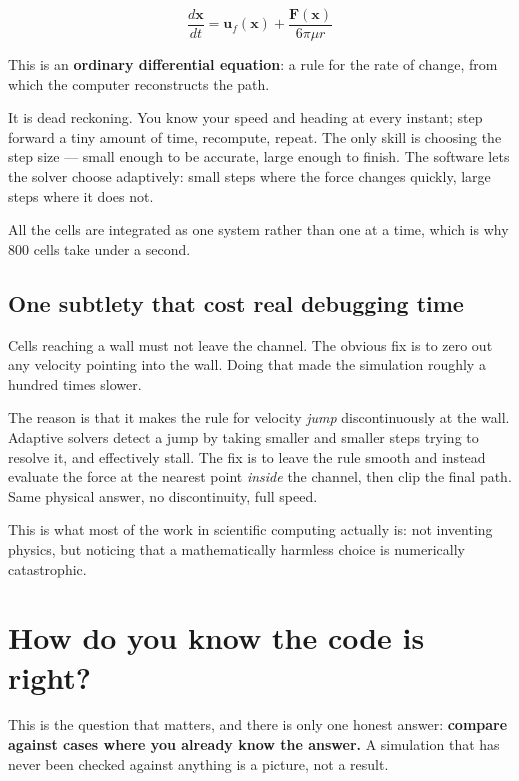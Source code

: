 \documentclass[11pt,a4paper]{article}
\begin{document}
\begin{equation}
\frac{d\symbf{x}}{dt}=\symbf{u}_f(\symbf{x})+\frac{\symbf{F}(\symbf{x})}{6\pi\mu r}
\end{equation}

This is an \textbf{ordinary differential equation}: a rule for the rate of
change, from which the computer reconstructs the path.

\begin{analogy}
It is dead reckoning. You know your speed and heading at every instant; step
forward a tiny amount of time, recompute, repeat. The only skill is choosing the
step size --- small enough to be accurate, large enough to finish. The software
lets the solver choose adaptively: small steps where the force changes quickly,
large steps where it does not.
\end{analogy}

All the cells are integrated as one system rather than one at a time, which is
why 800 cells take under a second.

\subsection*{One subtlety that cost real debugging time}

Cells reaching a wall must not leave the channel. The obvious fix is to zero out
any velocity pointing into the wall. Doing that made the simulation roughly a
hundred times slower.

The reason is that it makes the rule for velocity \emph{jump} discontinuously at
the wall. Adaptive solvers detect a jump by taking smaller and smaller steps
trying to resolve it, and effectively stall. The fix is to leave the rule smooth
and instead evaluate the force at the nearest point \emph{inside} the channel,
then clip the final path. Same physical answer, no discontinuity, full speed.

\begin{plain}
This is what most of the work in scientific computing actually is: not
inventing physics, but noticing that a mathematically harmless choice is
numerically catastrophic.
\end{plain}

\section{How do you know the code is right?}

This is the question that matters, and there is only one honest answer:
\textbf{compare against cases where you already know the answer.} A simulation
that has never been checked against anything is a picture, not a result.
\end{document}

